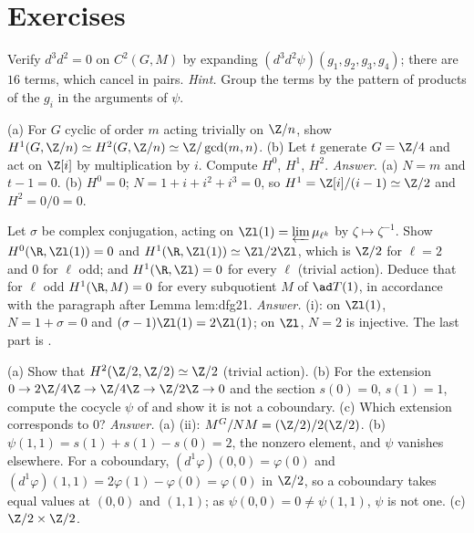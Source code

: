 \section{Exercises}\label{sec:cohomology:exercises}

\begin{exercise}\label{ex:cohomology:dd3}
Verify $d^3d^2=0$ on $C^2(G,M)$ by expanding $(d^3d^2\psi)(g_1,g_2,g_3,g_4)$; there are $16$ terms, which cancel in pairs.
\emph{Hint.} Group the terms by the pattern of products of the $g_i$ in the arguments of $\psi$.
\end{exercise}

\begin{exercise}\label{ex:cohomology:cyclic-ex}
(a) For $G$ cyclic of order $m$ acting trivially on $\Z/n$, show $H^1(G,\Z/n)\simeq H^2(G,\Z/n)\simeq\Z/\gcd(m,n)$. (b) Let $t$ generate $G=\Z/4$ and act on $\Z[i]$ by multiplication by $i$.
Compute $H^0$, $H^1$, $H^2$.
\emph{Answer.} (a) $N=m$ and $t-1=0$. (b) $H^0=0$; $N=1+i+i^2+i^3=0$, so $H^1=\Z[i]/(i-1)\simeq\Z/2$ and $H^2=0/0=0$.
\end{exercise}

\begin{exercise}\label{ex:cohomology:real-place-ex}
Let $\sigma$ be complex conjugation, acting on $\Zl(1)=\varprojlim\mu_{\ell^k}$ by $\zeta\mapsto\zeta^{-1}$. Show $H^0(\R,\Zl(1))=0$ and $H^1(\R,\Zl(1))\simeq\Zl/2\Zl$, which is $\Z/2$
for $\ell=2$ and $0$ for $\ell$ odd; and $H^1(\R,\Zl)=0$ for every $\ell$ (trivial action). Deduce that for $\ell$ odd $H^1(\R,M)=0$ for every subquotient $M$ of
$\ad T(1)$, in accordance with the paragraph after Lemma lem:dfg21.
\emph{Answer.} (i): on $\Zl(1)$, $N=1+\sigma=0$ and $(\sigma-1)\Zl(1)=2\Zl(1)$; on $\Zl$, $N=2$ is injective. The last part is
.
\end{exercise}

\begin{exercise}\label{ex:cohomology:z4}
(a) Show that $H^2(\Z/2,\Z/2)\simeq\Z/2$ (trivial action). (b) For the extension $0\to2\Z/4\Z\to\Z/4\Z\to\Z/2\Z\to0$ and the section $s(0)=0$, $s(1)=1$, compute the cocycle
$\psi$ of  and show it is not a coboundary. (c) Which extension corresponds to $0$?
\emph{Answer.} (a) (ii): $M^G/NM=(\Z/2)/2(\Z/2)$. (b) $\psi(1,1)=s(1)+s(1)-s(0)=2$, the nonzero element, and $\psi$ vanishes elsewhere. For a coboundary,
$(d^1\varphi)(0,0)=\varphi(0)$ and $(d^1\varphi)(1,1)=2\varphi(1)-\varphi(0)=\varphi(0)$ in $\Z/2$, so a coboundary takes equal values at $(0,0)$ and $(1,1)$; as
$\psi(0,0)=0\ne\psi(1,1)$, $\psi$ is not one. (c) $\Z/2\times\Z/2$.
\end{exercise}

